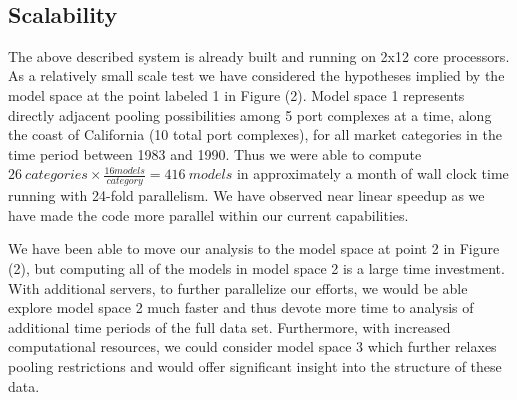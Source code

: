 \documentclass[12pt]{article}
\begin{document}

%
$~$\\
\vspace{-0.9cm}
\subsection{Scalability}\label{scalability}
%
The above described system is already built and running on 2x12 core
processors. As a relatively small scale test we have considered the hypotheses implied by the model space at the point labeled 1 in Figure (2).
Model space 1 represents directly adjacent pooling possibilities among 5 port complexes at a
time, along the coast of California (10 total port complexes), for all
market categories in the time period between 1983 and 1990. Thus we were able to compute
$26~categories \times \frac{16 models}{category} = 416~models$ in
approximately a month of wall clock time running with 24-fold
parallelism. We have observed near linear speedup as we have made the code more
parallel within our current capabilities.

%
We have been able to move our analysis to the model space at point 2 in Figure (2), but computing all of the models in model space 2 is a large time investment.
With additional servers, to further parallelize our efforts, we would be able explore model space 2 much faster and thus devote more time to analysis of additional 
time periods of the full data set. 
Furthermore, with increased computational resources, we could consider model space 3 which further relaxes pooling restrictions and would offer significant insight into the structure of these data.

\end{document}

